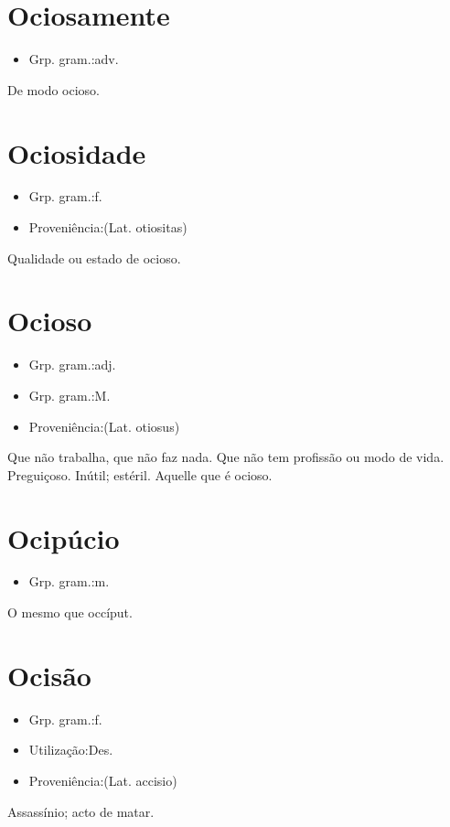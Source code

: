 \section{Ociosamente}
\begin{itemize}
\item {Grp. gram.:adv.}
\end{itemize}
De modo ocioso.
\section{Ociosidade}
\begin{itemize}
\item {Grp. gram.:f.}
\end{itemize}
\begin{itemize}
\item {Proveniência:(Lat. \textunderscore otiositas\textunderscore )}
\end{itemize}
Qualidade ou estado de ocioso.
\section{Ocioso}
\begin{itemize}
\item {Grp. gram.:adj.}
\end{itemize}
\begin{itemize}
\item {Grp. gram.:M.}
\end{itemize}
\begin{itemize}
\item {Proveniência:(Lat. \textunderscore otiosus\textunderscore )}
\end{itemize}
Que não trabalha, que não faz nada.
Que não tem profissão ou modo de vida.
Preguiçoso.
Inútil; estéril.
Aquelle que é ocioso.
\section{Ocipúcio}
\begin{itemize}
\item {Grp. gram.:m.}
\end{itemize}
O mesmo que \textunderscore occíput\textunderscore .
\section{Ocisão}
\begin{itemize}
\item {Grp. gram.:f.}
\end{itemize}
\begin{itemize}
\item {Utilização:Des.}
\end{itemize}
\begin{itemize}
\item {Proveniência:(Lat. \textunderscore accisio\textunderscore )}
\end{itemize}
Assassínio; acto de matar.
